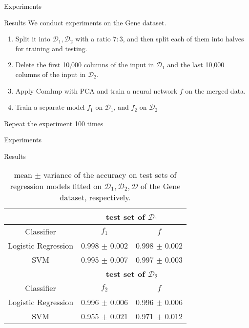 \documentclass[xcolor={dvipsnames}]{beamer} %
\begin{document}
\begin{frame}{Experiments}
\begin{block}{Results}
 We conduct experiments on the Gene dataset. 
 \begin{enumerate}
     \item Split it into $\mathcal{D}_1, \mathcal{D}_2$ with a ratio $7:3$, and then split each of them into halves for training and testing.
     \item Delete the first 10,000 columns of the input in $\mathcal{D}_1$ and the last 10,000 columns of the input in $\mathcal{D}_2$.
     \item Apply ComImp with PCA and train a neural network $f$ on the merged data.
     \item Train a separate model $f_1$ on $\mathcal{D}_1$, and $f_2$ on $\mathcal{D}_2$
 \end{enumerate}
 Repeat the experiment 100 times
\end{block}
\end{frame}

\begin{frame}{Experiments}
    \begin{block}{Results}
        \begin{table}[htbp]
        \caption{mean $\pm$ variance of the accuracy on test sets of regression models fitted on $\mathcal{D}_1,\mathcal{D}_2,\mathcal{D}$ of the Gene dataset, respectively.}
\label{tab-gene}
\begin{center}
\begin{tabular}{|c|c|c|}
\hline
\multicolumn{1}{|c|}{}& \multicolumn{2}{|c|}{\bf test set of $\mathcal{D}_1$}
\\ \hline 
\multicolumn{1}{|c|}{Classifier}& \multicolumn{1}{|c|}{\bf ${f}_1$}  &\multicolumn{1}{|c|}{\bf ${f}$}
\\ \hline 
Logistic Regression & 0.998 $\pm$ 0.002 &0.998 $\pm$ 0.002\\\hline
SVM & 0.995 $\pm$ 0.007 & 0.997 $\pm$ 0.003\\ \hline
\hline
\multicolumn{1}{|c|}{}&\multicolumn{2}{|c|}{\bf test set of $\mathcal{D}_2$}
\\ \hline 
\multicolumn{1}{|c|}{Classifier}&\multicolumn{1}{|c|}{\bf ${f}_2$} &\multicolumn{1}{|c|}{\bf ${f}$}
\\ \hline 
Logistic Regression & 0.996 $\pm$ 0.006 & 0.996 $\pm$ 0.006\\\hline
SVM & 0.955 $\pm$ 0.021 & 0.971 $\pm$ 0.012\\ \hline
\end{tabular}
\end{center}
        \end{table}
    \end{block}
\end{frame}
\end{document}
